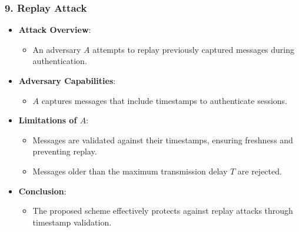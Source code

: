 \documentclass[9pt,handout]{beamer}
\begin{document}
\begin{frame}
    \frametitle{9. Replay Attack}
    \begin{itemize}
        \item \textbf{Attack Overview}:
            \begin{itemize}
                \item An adversary \( A \) attempts to replay previously captured messages during authentication.
            \end{itemize}
        \item \textbf{Adversary Capabilities}:
            \begin{itemize}
                \item \( A \) captures messages that include timestamps to authenticate sessions.
            \end{itemize}
        \item \textbf{Limitations of \( A \)}:
            \begin{itemize}
                \item Messages are validated against their timestamps, ensuring freshness and preventing replay.
                \item Messages older than the maximum transmission delay \( T \) are rejected.
            \end{itemize}
        \item \textbf{Conclusion}:
            \begin{itemize}
                \item The proposed scheme effectively protects against replay attacks through timestamp validation.
            \end{itemize}
    \end{itemize}
\end{frame}
\end{document}

